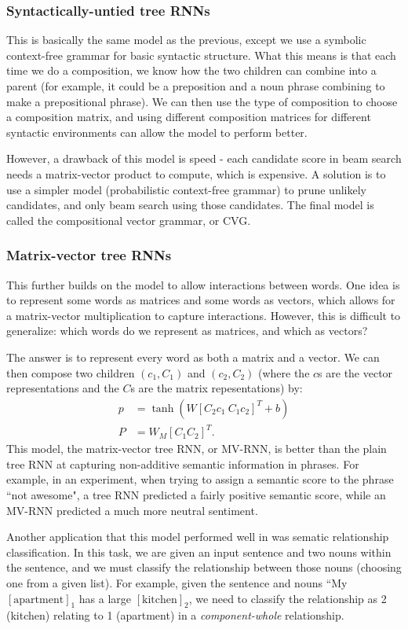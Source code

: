 \subsubsection{Syntactically-untied tree RNNs}
This is basically the same model as the previous, except we use a symbolic context-free grammar for basic syntactic structure. What this means is that each time we do a composition, we know how the two children can combine into a parent (for example, it could be a preposition and a noun phrase combining to make a prepositional phrase). We can then use the type of composition to choose a composition matrix, and using different composition matrices for different syntactic environments can allow the model to perform better.

However, a drawback of this model is speed - each candidate score in beam search needs a matrix-vector product to compute, which is expensive. A solution is to use a simpler model (probabilistic context-free grammar) to prune unlikely candidates, and only beam search using those candidates. The final model is called the compositional vector grammar, or CVG.

\subsubsection{Matrix-vector tree RNNs}
This further builds on the model to allow interactions between words. One idea is to represent some words as matrices and some words as vectors, which allows for a matrix-vector multiplication to capture interactions. However, this is difficult to generalize: which words do we represent as matrices, and which as vectors?

The answer is to represent every word as both a matrix and a vector. We can then compose two children $(c_1, C_1)$ and $(c_2, C_2)$ (where the $c$s are the vector representations and the $C$s are the matrix repesentations) by:
\begin{align*}
p &= \tanh\left(W \left[C_2c_1~C_1c_2\right]^T + b\right)\\
P &= W_M\left[C_1C_2\right]^T.
\end{align*}
This model, the matrix-vector tree RNN, or MV-RNN, is better than the plain tree RNN at capturing non-additive semantic information in phrases. For example, in an experiment, when trying to assign a semantic score to the phrase ``not awesome", a tree RNN predicted a fairly positive semantic score, while an MV-RNN predicted a much more neutral sentiment.

Another application that this model performed well in was sematic relationship classification. In this task, we are given an input sentence and two nouns within the sentence, and we must classify the relationship between those nouns (choosing one from a given list). For example, given the sentence and nouns ``My $[\text{apartment}]_1$ has a large $[\text{kitchen}]_2$, we need to classify the relationship as 2 (kitchen) relating to 1 (apartment) in a \emph{component-whole} relationship.

